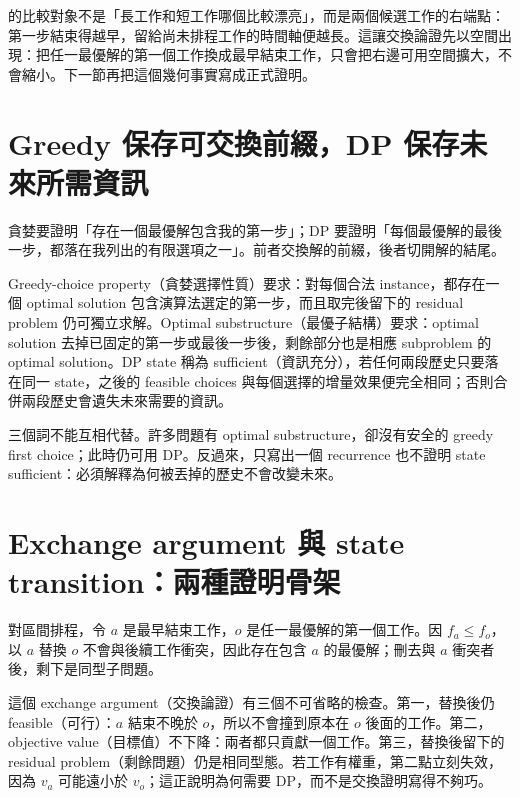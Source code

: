 \documentclass[11pt,a4paper,oneside,openany]{book}
\begin{document}
 的比較對象不是「長工作和短工作哪個比較漂亮」，而是兩個候選工作的右端點：第一步結束得越早，留給尚未排程工作的時間軸便越長。這讓交換論證先以空間出現：把任一最優解的第一個工作換成最早結束工作，只會把右邊可用空間擴大，不會縮小。下一節再把這個幾何事實寫成正式證明。

\section{Greedy 保存可交換前綴，DP 保存未來所需資訊}
\begin{coreintuition}
貪婪要證明「存在一個最優解包含我的第一步」；DP 要證明「每個最優解的最後一步，都落在我列出的有限選項之一」。前者交換解的前綴，後者切開解的結尾。
\end{coreintuition}

\begin{definition}
Greedy-choice property（貪婪選擇性質）要求：對每個合法 instance，都存在一個 optimal solution 包含演算法選定的第一步，而且取完後留下的 residual problem 仍可獨立求解。Optimal substructure（最優子結構）要求：optimal solution 去掉已固定的第一步或最後一步後，剩餘部分也是相應 subproblem 的 optimal solution。DP state 稱為 sufficient（資訊充分），若任何兩段歷史只要落在同一 state，之後的 feasible choices 與每個選擇的增量效果便完全相同；否則合併兩段歷史會遺失未來需要的資訊。
\end{definition}

三個詞不能互相代替。許多問題有 optimal substructure，卻沒有安全的 greedy first choice；此時仍可用 DP。反過來，只寫出一個 recurrence 也不證明 state sufficient：必須解釋為何被丟掉的歷史不會改變未來。

\section{Exchange argument 與 state transition：兩種證明骨架}
對區間排程，令 $a$ 是最早結束工作，$o$ 是任一最優解的第一個工作。因 $f_a\le f_o$，以 $a$ 替換 $o$ 不會與後續工作衝突，因此存在包含 $a$ 的最優解；刪去與 $a$ 衝突者後，剩下是同型子問題。

這個 exchange argument（交換論證）有三個不可省略的檢查。第一，替換後仍 feasible（可行）：$a$ 結束不晚於 $o$，所以不會撞到原本在 $o$ 後面的工作。第二，objective value（目標值）不下降：兩者都只貢獻一個工作。第三，替換後留下的 residual problem（剩餘問題）仍是相同型態。若工作有權重，第二點立刻失效，因為 $v_a$ 可能遠小於 $v_o$；這正說明為何需要 DP，而不是交換證明寫得不夠巧。
\end{document}
